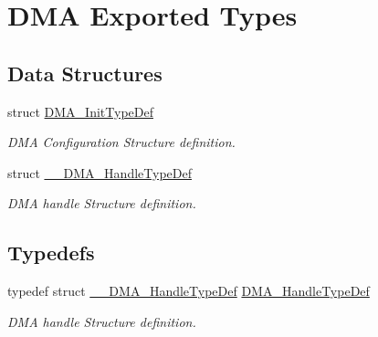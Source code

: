 \hypertarget{group___d_m_a___exported___types}{}\section{D\+MA Exported Types}
\label{group___d_m_a___exported___types}
\subsection*{Data Structures}
\begin{DoxyCompactItemize}
\item 
struct \hyperlink{struct_d_m_a___init_type_def}{D\+M\+A\+\_\+\+Init\+Type\+Def}
\begin{DoxyCompactList}\small\item\em D\+MA Configuration Structure definition. \end{DoxyCompactList}\item 
struct \hyperlink{struct_____d_m_a___handle_type_def}{\+\_\+\+\_\+\+D\+M\+A\+\_\+\+Handle\+Type\+Def}
\begin{DoxyCompactList}\small\item\em D\+MA handle Structure definition. \end{DoxyCompactList}\end{DoxyCompactItemize}
\subsection*{Typedefs}
\begin{DoxyCompactItemize}
\item 
\mbox{\label{group___d_m_a___exported___types_ga92b907d56a9c29b93d46782a7a04f91e}} 
typedef struct \hyperlink{struct_____d_m_a___handle_type_def}{\+\_\+\+\_\+\+D\+M\+A\+\_\+\+Handle\+Type\+Def} \hyperlink{group___d_m_a___exported___types_ga92b907d56a9c29b93d46782a7a04f91e}{D\+M\+A\+\_\+\+Handle\+Type\+Def}
\begin{DoxyCompactList}\small\item\em D\+MA handle Structure definition. \end{DoxyCompactList}\end{DoxyCompactItemize}
